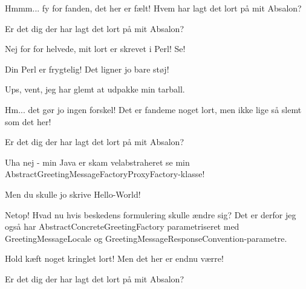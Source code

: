 \documentclass[a4paper,11pt]{article}
\begin{document}
  \begin{sketch}

     Hmmm... fy for fanden, det her er fælt!  Hvem har lagt det lort på
    mit Absalon?


     Er det dig der har lagt det lort på mit Absalon? 


     Nej for for helvede, mit lort er skrevet i Perl!  Se!

     Din Perl er frygtelig!  Det ligner jo bare støj!

     Ups, vent, jeg har glemt at udpakke min tarball.


     Hm... det gør jo ingen forskel!  Det er fandeme noget
    lort, men ikke lige så slemt som det her!


     Er det dig der har lagt det lort på mit Absalon? 


     Uha nej - min Java er skam velabstraheret
     se min\\
    AbstractGreetingMessageFactoryProxyFactory-klasse!

     Men du skulle jo skrive Hello-World!

     Netop!  Hvad nu hvis beskedens formulering skulle ændre
    sig?  Det er
    derfor jeg også har AbstractConcreteGreetingFactory parametriseret
    med GreetingMessageLocale og
    GreetingMessageResponseConvention-parametre.

     Hold kæft noget kringlet lort!  Men det her er endnu
    værre!


     Er det dig der har lagt det lort på mit Absalon? 


\end{sketch}
\end{document}
